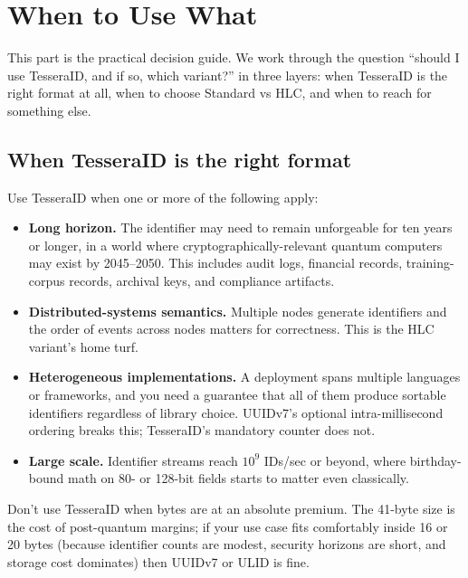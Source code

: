 \section{When to Use What}
\label{sec:when}

This part is the practical decision guide. We work through the question ``should I use TesseraID, and if so, which variant?'' in three layers: when TesseraID is the right format at all, when to choose Standard vs HLC, and when to reach for something else.

\subsection{When TesseraID is the right format}

Use TesseraID when one or more of the following apply:

\begin{itemize}
  \item \textbf{Long horizon.} The identifier may need to remain unforgeable for ten years or longer, in a world where cryptographically-relevant quantum computers may exist by 2045--2050. This includes audit logs, financial records, training-corpus records, archival keys, and compliance artifacts.
  \item \textbf{Distributed-systems semantics.} Multiple nodes generate identifiers and the order of events across nodes matters for correctness. This is the HLC variant's home turf.
  \item \textbf{Heterogeneous implementations.} A deployment spans multiple languages or frameworks, and you need a guarantee that all of them produce sortable identifiers regardless of library choice. UUIDv7's optional intra-millisecond ordering breaks this; TesseraID's mandatory counter does not.
  \item \textbf{Large scale.} Identifier streams reach $10^9$ IDs/sec or beyond, where birthday-bound math on 80- or 128-bit fields starts to matter even classically.
\end{itemize}

Don't use TesseraID when bytes are at an absolute premium. The 41-byte size is the cost of post-quantum margins; if your use case fits comfortably inside 16 or 20 bytes (because identifier counts are modest, security horizons are short, and storage cost dominates) then UUIDv7 or ULID is fine.

